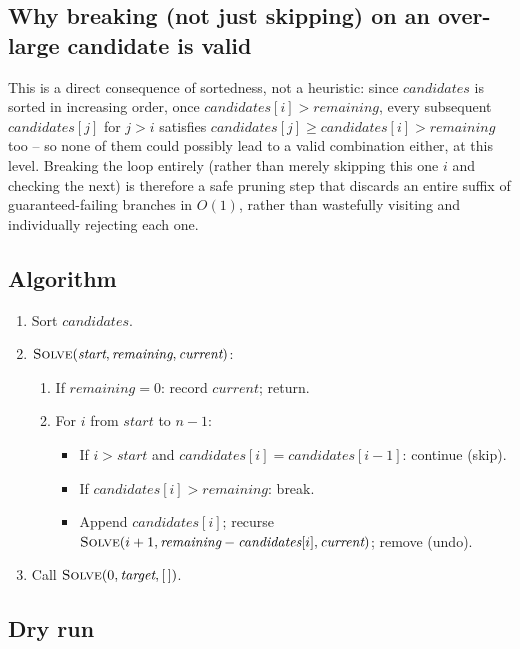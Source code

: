 \subsection*{Why breaking (not just skipping) on an over-large candidate is valid}

This is a direct consequence of sortedness, not a heuristic: since
$\textit{candidates}$ is sorted in increasing order, once
$\textit{candidates}[i] > \textit{remaining}$, every subsequent
$\textit{candidates}[j]$ for $j>i$ satisfies $\textit{candidates}[j] \ge
\textit{candidates}[i] > \textit{remaining}$ too -- so none of them could
possibly lead to a valid combination either, at this level. Breaking the
loop entirely (rather than merely skipping this one $i$ and checking the
next) is therefore a safe pruning step that discards an entire suffix of
guaranteed-failing branches in $O(1)$, rather than wastefully visiting
and individually rejecting each one.

\subsection*{Algorithm}

\begin{enumerate}
  \item Sort $\textit{candidates}$.
  \item $\textsc{Solve}(\textit{start}, \textit{remaining}, \textit{current})$:
  \begin{enumerate}
    \item If $\textit{remaining}=0$: record $\textit{current}$; return.
    \item For $i$ from $\textit{start}$ to $n-1$:
    \begin{itemize}
      \item If $i>\textit{start}$ and $\textit{candidates}[i] =
            \textit{candidates}[i-1]$: continue (skip).
      \item If $\textit{candidates}[i] > \textit{remaining}$: break.
      \item Append $\textit{candidates}[i]$; recurse
            $\textsc{Solve}(i+1, \textit{remaining} -
            \textit{candidates}[i], \textit{current})$; remove (undo).
    \end{itemize}
  \end{enumerate}
  \item Call $\textsc{Solve}(0, \textit{target}, [\,])$.
\end{enumerate}

\subsection*{Dry run}

